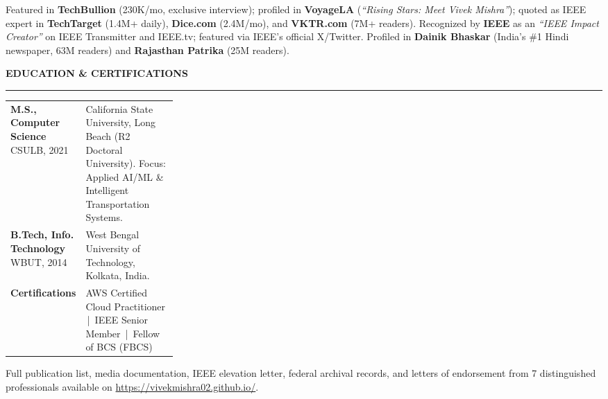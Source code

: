 \documentclass[10pt, letterpaper]{article}
\newcommand{\sect}[1]{%
  \vspace{7pt}%
  {\small\bfseries\color{navy}\MakeUppercase{#1}}%
  \vspace{1pt}%
  {\color{rulegray}\hrule height 0.9pt}%
  \vspace{4pt}%
}
\begin{document}
{\small\color{bodytext}
Featured in \textbf{TechBullion} (230K/mo, exclusive interview);
profiled in \textbf{VoyageLA} (\textit{``Rising Stars: Meet Vivek Mishra''});
quoted as IEEE expert in \textbf{TechTarget} (1.4M+ daily), \textbf{Dice.com} (2.4M/mo),
and \textbf{VKTR.com} (7M+ readers).
Recognized by \textbf{IEEE} as an \textit{``IEEE Impact Creator''} on IEEE Transmitter and IEEE.tv;
featured via IEEE's official X/Twitter.
Profiled in \textbf{Dainik Bhaskar} (India's \#1 Hindi newspaper, 63M readers) and
\textbf{Rajasthan Patrika} (25M readers).
}

\sect{Education \& Certifications}

\begin{tabularx}{\linewidth}{@{}p{0.28\linewidth}X@{}}
  \textbf{\small\color{navy}M.S., Computer Science} \newline
  {\scriptsize\color{graytext}CSULB, 2021} &
  {\small California State University, Long Beach (R2 Doctoral University).
  Focus: Applied AI/ML \& Intelligent Transportation Systems.}\\[4pt]

  \textbf{\small\color{navy}B.Tech, Info. Technology} \newline
  {\scriptsize\color{graytext}WBUT, 2014} &
  {\small West Bengal University of Technology, Kolkata, India.}\\[4pt]

  \textbf{\small\color{navy}Certifications} &
  {\small AWS Certified Cloud Practitioner \,|\, IEEE Senior Member \,|\, Fellow of BCS (FBCS)}\\
\end{tabularx}

\vspace{6pt}
\vspace{3pt}
\begin{center}
\scriptsize\color{graytext}
Full publication list, media documentation, IEEE elevation letter, federal archival records, and letters of endorsement from 7 distinguished professionals available on \href{https://vivekmishra02.github.io/}{https://vivekmishra02.github.io/}.
\end{center}
\end{document}
